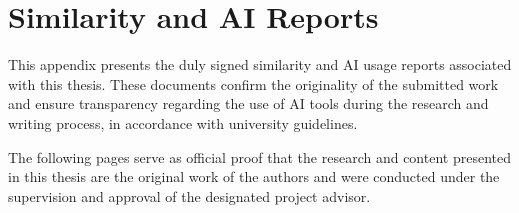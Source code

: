 \chapter{Similarity and AI Reports}

This appendix presents the duly signed similarity and AI usage reports associated with
this thesis. These documents confirm the originality of the submitted work and ensure
transparency regarding the use of AI tools during the research and writing process, in
accordance with university guidelines.

The following pages serve as official proof that the research and content presented in
this thesis are the original work of the authors and were conducted under the supervision
and approval of the designated project advisor.
